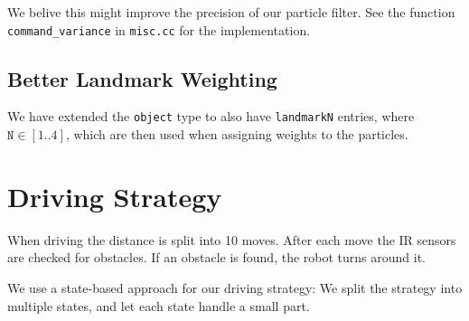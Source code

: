 \documentclass[a4paper,12pt]{article}
\begin{document}
We belive this might improve the precision of our particle filter.  See the
function \texttt{command_variance} in \texttt{misc.cc} for the implementation.


\subsection{Better Landmark Weighting}

We have extended the \texttt{object} type to also have \texttt{landmarkN}
entries, where $\texttt{N} \in [1..4]$, which are then used when assigning
weights to the particles.


\newpage
\section{Driving Strategy}

When driving the distance is split into 10 moves.  After each move the IR
sensors are checked for obstacles.  If an obstacle is found, the robot turns
around it.

We use a state-based approach for our driving strategy: We split the strategy
into multiple states, and let each state handle a small part.
\end{document}
